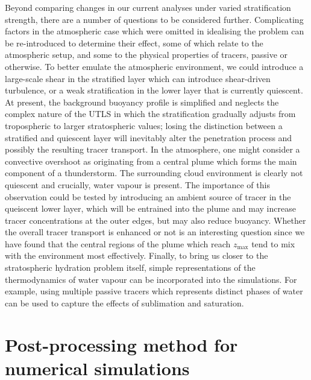 \documentclass[a4paper]{article}
\begin{document}
Beyond comparing changes in our current analyses under varied stratification strength, there are a number of
questions to be considered further. Complicating factors in the atmospheric case which were omitted in
idealising the problem can be re-introduced to determine their effect, some of which relate to the atmospheric
setup, and some to the physical properties of tracers, passive or otherwise. To better emulate the atmospheric
environment, we could introduce a large-scale shear in the stratified layer which can introduce shear-driven
turbulence, or a weak stratification in the lower layer that is currently quiescent. At present, the
background buoyancy profile is simplified and neglects the complex nature of the UTLS in which the
stratification gradually adjusts from tropospheric to larger stratospheric values; losing the distinction
between a stratified and quiescent layer will inevitably alter the penetration process and possibly the
resulting tracer transport. In the atmosphere, one might consider a convective overshoot as originating from a
central plume which forms the main component of a thunderstorm. The surrounding cloud environment is clearly
not quiescent and crucially, water vapour is present. The importance of this observation could be tested by
introducing an ambient source of tracer in the queiscent lower layer, which will be entrained into the plume
and may increase tracer concentrations at the outer edges, but may also reduce buoyancy. Whether the overall
tracer transport is enhanced or not is an interesting question since we have found that the central regions of
the plume which reach $z_{\max}$ tend to mix with the environment most effectively. Finally, to bring us
closer to the stratospheric hydration problem itself, simple representations of the thermodynamics of water
vapour can be incorporated into the simulations. For example, using multiple passive tracers which represents
distinct phases of water can be used to capture the effects of sublimation and saturation.


\appendix

\section{Post-processing method for numerical simulations}
\label{app:postprocessing}
\end{document}
